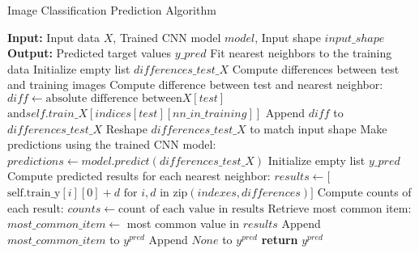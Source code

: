 \documentclass[a4paper, 12pt]{report}
\begin{document}
\begin{algorithm}
    \caption{Image Classification Prediction Algorithm}
    \label{alg:image_classification_final_prediction}
    \begin{algorithmic}[1]
            \State \textbf{Input:} Input data $X$, Trained CNN model $model$, Input shape $input\_shape$
            \State \textbf{Output:} Predicted target values $y\_pred$
            \State Fit nearest neighbors to the training data
            \State Initialize empty list $differences\_test\_X$
            \State Compute differences between test and training images
                    \State Compute difference between test and nearest neighbor: 
                    \State $diff \gets \text{absolute difference between} X[test]$
                    \State \hspace{\algorithmicindent} $\text{and} self.train\_X[indices[test][nn\_in\_training]]$
                    \State Append $diff$ to $differences\_test\_X$
                \EndFor
            \EndFor
            \State Reshape $differences\_test\_X$ to match input shape
            \State Make predictions using the trained CNN model: 
            \State $predictions \gets model.predict(differences\_test\_X)$
            \State Initialize empty list $y\_pred$
                \State Compute predicted results for each nearest neighbor:
                \State $results \gets [$
                \State \hspace{\algorithmicindent} $\text{self.train\_y}[i][0] + d$
                \State \hspace{\algorithmicindent} $\text{for } i, d \text{ in zip}(indexes, differences)]$
                \State Compute counts of each result: 
                \State $counts \gets \text{count of each value in results}$
                \State Retrieve most common item:
                \State $most\_common\_item \gets$ most common value in $results$
                    \State Append $most\_common\_item$ to $y^{pred}$
                \Else
                    \State Append $None$ to $y^{pred}$ 
                \EndIf
            \EndFor
            \State \textbf{return} $y^{pred}$
        \EndFunction
    \end{algorithmic}
\end{algorithm}
\clearpage
\end{document}
